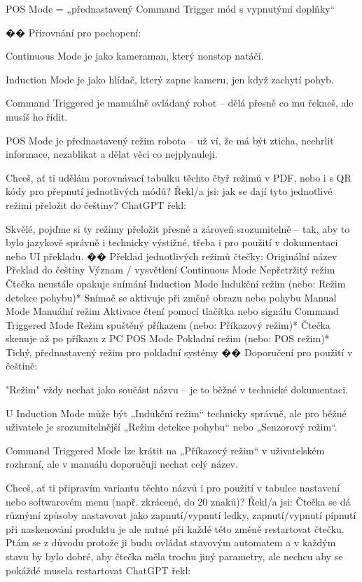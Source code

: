     POS Mode = „přednastavený Command Trigger mód s vypnutými doplňky“

�� Přirovnání pro pochopení:

    Continuous Mode je jako kameraman, který nonstop natáčí.

    Induction Mode je jako hlídač, který zapne kameru, jen když zachytí pohyb.

    Command Triggered je manuálně ovládaný robot – dělá přesně co mu řekneš, ale musíš ho řídit.

    POS Mode je přednastavený režim robota – už ví, že má být zticha, nechrlit informace, nezablikat a dělat věci co nejplynuleji.

Chceš, ať ti udělám porovnávací tabulku těchto čtyř režimů v PDF, nebo i s QR kódy pro přepnutí jednotlivých módů?
Řekl/a jsi:
jak se dají tyto jednotlivé režimi přeložit do češtiny?
ChatGPT řekl:

Skvělé, pojďme si ty režimy přeložit přesně a zároveň srozumitelně – tak, aby to bylo jazykově správně i technicky výstižné, třeba i pro použití v dokumentaci nebo UI překladu.
�� Překlad jednotlivých režimů čtečky:
Originální název	Překlad do češtiny	Význam / vysvětlení
Continuous Mode	Nepřetržitý režim	Čtečka neustále opakuje snímání
Induction Mode	Indukční režim (nebo: Režim detekce pohybu)*	Snímač se aktivuje při změně obrazu nebo pohybu
Manual Mode	Manuální režim	Aktivace čtení pomocí tlačítka nebo signálu
Command Triggered Mode	Režim spuštěný příkazem (nebo: Příkazový režim)*	Čtečka skenuje až po příkazu z PC
POS Mode	Pokladní režim (nebo: POS režim)*	Tichý, přednastavený režim pro pokladní systémy
�� Doporučení pro použití v češtině:

    "Režim" vždy nechat jako součást názvu – je to běžné v technické dokumentaci.

    U Induction Mode může být „Indukční režim“ technicky správně, ale pro běžné uživatele je srozumitelnější „Režim detekce pohybu“ nebo „Senzorový režim“.

    Command Triggered Mode lze krátit na „Příkazový režim“ v uživatelském rozhraní, ale v manuálu doporučuji nechat celý název.

Chceš, ať ti připravím variantu těchto názvů i pro použití v tabulce nastavení nebo softwarovém menu (např. zkrácené, do 20 znaků)?
Řekl/a jsi:
Čtečka se dá různýmí způsoby nastavovat jako zapnutí/vypnutí ledky, zapnutí/vypnutí pípnutí při naskenování produktu je ale nutné při každé této změně restartovat čtečku. Ptám se z důvodu protože ji budu ovládat stavovým automatem a v každým stavu by bylo dobré, aby čtečka měla trochu jiný parametry, ale nechcu aby se pokáždé musela restartovat
ChatGPT řekl:

